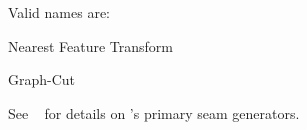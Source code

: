 \begin{codelist}
  Valid  names are:
  \begin{description}
  \item[\code{nearest-feature-transform}]\itemend
    Nearest Feature Transform

  \item[\code{graph-cut}]\itemx[\code{gc}]\itemend
    Graph-Cut
  \end{description}

  See \chapterName~ for details on \App's primary seam generators.
\end{codelist}



